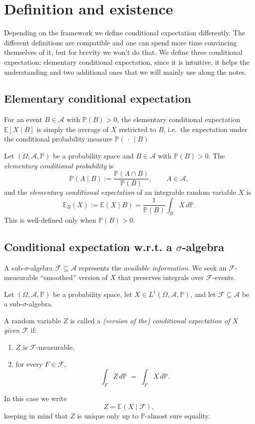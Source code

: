 \section{Definition and existence}
Depending on the framework we define conditional expectation differently. The different definitions are compatible and one can spend more time convincing themselves of it, but for brevity we won't do that. We define three conditional expectation: elementary conditional expectation, since it is intuitive, it helps the understanding and two additional ones that we will mainly use along the notes.

\subsection*{Elementary conditional expectation}
For an event $B\in\mathcal A$ with $\mathbb P(B)>0$, the elementary conditional expectation $\mathbb E[X\mid B]$
is simply the average of $X$ restricted to $B$, i.e.\ the expectation under the conditional probability measure
$\mathbb P(\,\cdot\,\mid B)$
\begin{definition}
Let $(\Omega,\mathcal A,\mathbb P)$ be a probability space and $B\in\mathcal A$ with $\mathbb P(B)>0$.
The \emph{elementary conditional probability} is
\[
\mathbb P(A\mid B):=\frac{\mathbb P(A\cap B)}{\mathbb P(B)},\qquad A\in\mathcal A,
\]
and the \emph{elementary conditional expectation} of an integrable random variable $X$ is
\[
\mathbb E_B(X):=\mathbb E(X\mid B)=\frac{1}{\mathbb P(B)}\int_B X\,d\mathbb P.
\]
This is well-defined only when $\mathbb P(B)>0$.     
\end{definition}


\subsection*{Conditional expectation w.r.t. a $\sigma$-algebra}
A sub-$\sigma$-algebra $\mathcal F\subseteq\mathcal A$ represents the \emph{available information}.
We seek an $\mathcal F$-measurable ``smoothed'' version of $X$ that preserves integrals over $\mathcal F$-events.   

Let $(\Omega,\mathcal A,\mathbb P)$ be a probability space, let $X\in L^1(\Omega,\mathcal A,\mathbb P)$, and let
$\mathcal F\subseteq \mathcal A$ be a sub-$\sigma$-algebra.

\begin{definition}
A random variable $Z$ is called a \emph{(version of the) conditional expectation of $X$ given $\mathcal F$} if:
\begin{enumerate}
\item[(i)] $Z$ is $\mathcal F$-measurable,
\item[(ii)] for every $F\in\mathcal F$,
\[
\int_F Z\,d\mathbb P \;=\; \int_F X\,d\mathbb P.
\]
\end{enumerate}
In this case we write
\[
Z=\mathbb E(X\mid \mathcal F),
\]
keeping in mind that $Z$ is unique only up to $\mathbb P$-almost sure equality.
\end{definition}

